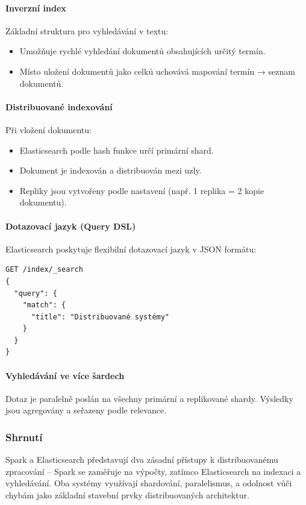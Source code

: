 \paragraph{Inverzní index}
Základní struktura pro vyhledávání v textu:
\begin{itemize}
    \item Umožňuje rychlé vyhledání dokumentů obsahujících určitý termín.
    \item Místo uložení dokumentů jako celků uchovává mapování termín → seznam dokumentů.
\end{itemize}

\paragraph{Distribuované indexování}
Při vložení dokumentu:
\begin{itemize}
    \item Elasticsearch podle hash funkce určí primární shard.
    \item Dokument je indexován a distribuován mezi uzly.
    \item Repliky jsou vytvořeny podle nastavení (např. 1 replika = 2 kopie dokumentu).
\end{itemize}

\paragraph{Dotazovací jazyk (Query DSL)}
Elasticsearch poskytuje flexibilní dotazovací jazyk v JSON formátu:
\begin{verbatim}
GET /index/_search
{
  "query": {
    "match": {
      "title": "Distribuované systémy"
    }
  }
}
\end{verbatim}

\paragraph{Vyhledávání ve více šardech}
Dotaz je paralelně poslán na všechny primární a replikované shardy. Výsledky jsou agregovány a seřazeny podle relevance.

\subsubsection*{Shrnutí}
Spark a Elasticsearch představují dva zásadní přístupy k distribuovanému zpracování – Spark se zaměřuje na výpočty, zatímco Elasticsearch na indexaci a vyhledávání. Oba systémy využívají shardování, paralelismus, a odolnost vůči chybám jako základní stavební prvky distribuovaných architektur.

